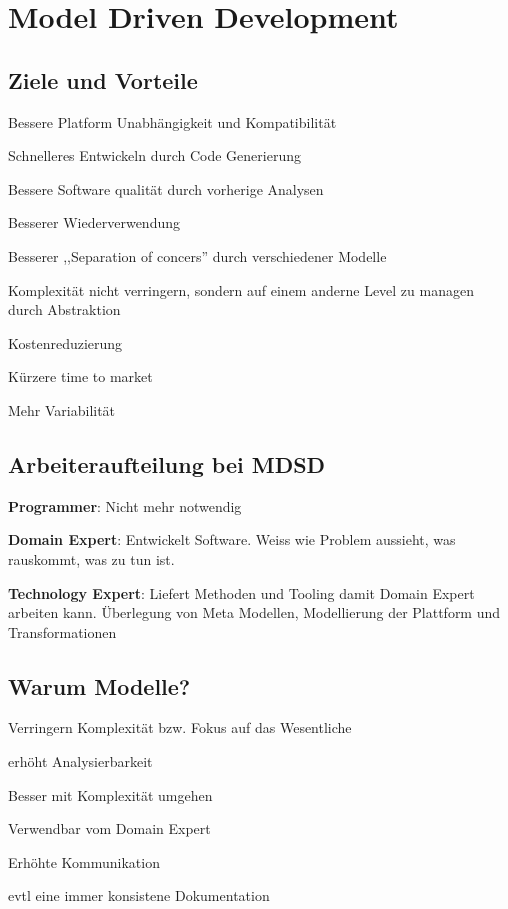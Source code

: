 \chapter{Model Driven Development}

\section{Ziele und Vorteile}
\begin{compactitem}
    \item Bessere Platform Unabhängigkeit und Kompatibilität
    \item Schnelleres Entwickeln durch Code Generierung
    \item Bessere Software qualität durch vorherige Analysen
    \item Besserer Wiederverwendung
    \item Besserer ,,Separation of concers'' durch verschiedener Modelle
    \item Komplexität nicht verringern, sondern auf einem anderne Level zu
    managen durch Abstraktion
\end{compactitem}
\begin{compactitem}
    \item Kostenreduzierung
    \item Kürzere time to market
    \item Mehr Variabilität
\end{compactitem}

\section{Arbeiteraufteilung bei MDSD}
\begin{compactitem}
    \item \textbf{Programmer}: Nicht mehr notwendig
    \item \textbf{Domain Expert}: Entwickelt Software. Weiss wie Problem aussieht,
    was rauskommt, was zu tun ist.
    \item \textbf{Technology Expert}: Liefert Methoden und Tooling damit Domain
    Expert arbeiten kann. Überlegung von Meta Modellen, Modellierung der Plattform
    und Transformationen
\end{compactitem}

\section{Warum Modelle?}
\begin{compactitem}
    \item Verringern Komplexität bzw. Fokus auf das Wesentliche
    \item erhöht Analysierbarkeit
    \item Besser mit Komplexität umgehen
    \item Verwendbar vom Domain Expert
    \item Erhöhte Kommunikation
    \item evtl eine immer konsistene Dokumentation
\end{compactitem}

